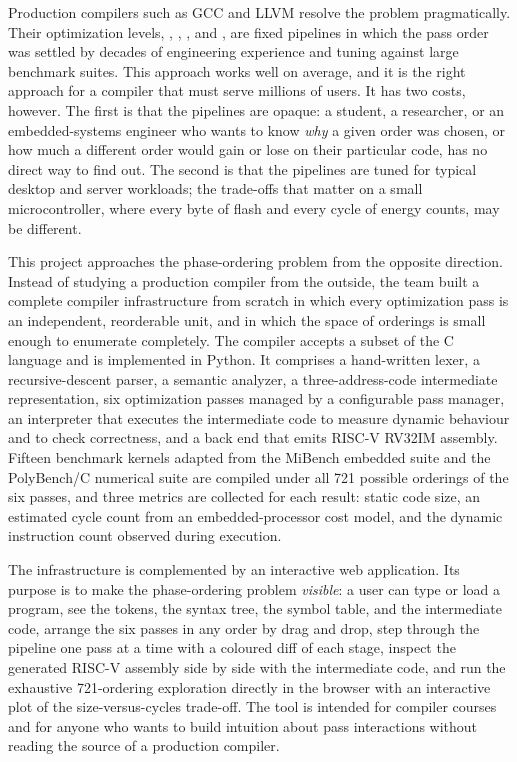 Production compilers such as GCC and LLVM \cite{lattner2004} resolve the problem pragmatically. Their optimization levels, , , , and , are fixed pipelines in which the pass order was settled by decades of engineering experience and tuning against large benchmark suites. This approach works well on average, and it is the right approach for a compiler that must serve millions of users. It has two costs, however. The first is that the pipelines are opaque: a student, a researcher, or an embedded-systems engineer who wants to know \emph{why} a given order was chosen, or how much a different order would gain or lose on their particular code, has no direct way to find out. The second is that the pipelines are tuned for typical desktop and server workloads; the trade-offs that matter on a small microcontroller, where every byte of flash and every cycle of energy counts, may be different.

This project approaches the phase-ordering problem from the opposite direction. Instead of studying a production compiler from the outside, the team built a complete compiler infrastructure from scratch in which every optimization pass is an independent, reorderable unit, and in which the space of orderings is small enough to enumerate completely. The compiler accepts a subset of the C language and is implemented in Python. It comprises a hand-written lexer, a recursive-descent parser, a semantic analyzer, a three-address-code intermediate representation, six optimization passes managed by a configurable pass manager, an interpreter that executes the intermediate code to measure dynamic behaviour and to check correctness, and a back end that emits RISC-V RV32IM assembly. Fifteen benchmark kernels adapted from the MiBench embedded suite \cite{guthaus2001} and the PolyBench/C numerical suite \cite{pouchet2016} are compiled under all 721 possible orderings of the six passes, and three metrics are collected for each result: static code size, an estimated cycle count from an embedded-processor cost model, and the dynamic instruction count observed during execution.

The infrastructure is complemented by an interactive web application. Its purpose is to make the phase-ordering problem \emph{visible}: a user can type or load a program, see the tokens, the syntax tree, the symbol table, and the intermediate code, arrange the six passes in any order by drag and drop, step through the pipeline one pass at a time with a coloured diff of each stage, inspect the generated RISC-V assembly side by side with the intermediate code, and run the exhaustive 721-ordering exploration directly in the browser with an interactive plot of the size-versus-cycles trade-off. The tool is intended for compiler courses and for anyone who wants to build intuition about pass interactions without reading the source of a production compiler.

